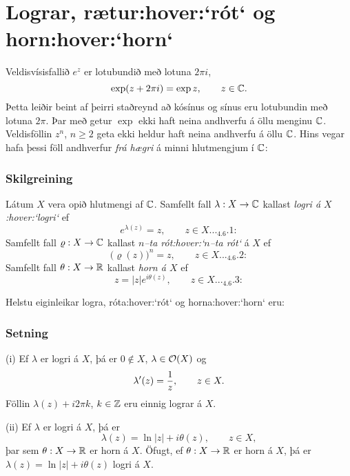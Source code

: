 \section{Lograr, rætur:hover:`rót` og horn:hover:`horn`}


\noindent
Veldisvísisfallið $e^z$ er lotubundið með lotuna $2\pi i$,
$$
\exp(z+2{\pi}i) = \exp z, \qquad z\in {\mathbb C}.
$$
Þetta leiðir beint af þeirri staðreynd að kósínus og sínus eru
lotubundin með lotuna $2{\pi}$.
Þar með getur $\exp$ ekki haft neina andhverfu á öllu menginu ${\mathbb C}$.  
Veldisföllin 
$z^n$, $n\geq 2$ geta ekki heldur haft neina andhverfu á öllu ${\mathbb C}$.
Hins vegar hafa þessi föll andhverfur {\it frá hægri } 
á minni hlutmengjum í ${\mathbb C}$:

\subsubsection{Skilgreining}
Látum $X$ vera opið hlutmengi af ${\mathbb C}$.  Samfellt fall $\lambda:X\to
{\mathbb C}$ kallast  {\it logri á $X$:hover:`logri`} ef
 \begin{equation*}e^{\lambda(z)}=z, \qquad z\in X.


.. _4.6.1:

 \end{equation*}
Samfellt fall $\varrho:X\to {\mathbb C}$ kallast {\it $n$--ta
rót:hover:`$n$--ta rót`} á $X$ ef
 \begin{equation*}\big(\varrho(z)\big)^n=z, \qquad z\in X.


.. _4.6.2:

 \end{equation*}
Samfellt fall $\theta:X\to {\mathbb R}$ kallast {\it horn á $X$} ef 
 \begin{equation*}z=|z|e^{i\theta(z)}, \qquad z\in X.


.. _4.6.3:

 \end{equation*}



Helstu eiginleikar logra, róta:hover:`rót` og horna:hover:`horn` eru:

\subsubsection{Setning} (i) Ef $\lambda$ er logri á $X$, þá er $0\not\in X$, $\lambda\in {\cal O}(X)$ og
 $$\lambda{\sp{\prime}}(z)=\frac 1z, \qquad z\in X.
 $$
Föllin $\lambda(z)+i2\pi k$, $k\in {\mathbb Z}$ eru einnig lograr á $X$.

\smallskip\noindent 
(ii) Ef $\lambda$ er logri á $X$, þá er  $$\lambda(z)=\ln
|z|+i\theta(z), \qquad z\in X,
 $$
þar sem  $\theta:X\to {\mathbb R}$ er horn á $X$.  Öfugt, ef 
$\theta:X\to {\mathbb R}$ er horn á $X$, þá er $\lambda(z)=\ln|z|+i\theta(z)$
logri á $X$.

